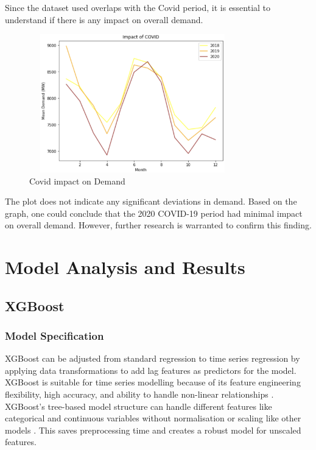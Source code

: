 \documentclass[mstat,12pt]{unswthesis}
\begin{document}
Since the dataset used overlaps with the Covid period, it is essential
to understand if there is any impact on overall demand.

\begin{figure}[H]
\centering
\includegraphics[width=0.80\textwidth,height=6cm]{covid_impact.png}
\caption{Covid impact on Demand}
\label{covid_impact}
\end{figure}

The plot does not indicate any significant deviations in demand. Based
on the graph, one could conclude that the 2020 COVID-19 period had
minimal impact on overall demand. However, further research is warranted
to confirm this finding.

\chapter{Model Analysis and Results}\label{model-analysis-and-results}

\section{XGBoost}\label{xgboost}

\subsection{Model Specification}\label{model-specification}

XGBoost can be adjusted from standard regression to time series
regression by applying data transformations to add lag features as
predictors for the model. XGBoost is suitable for time series modelling
because of its feature engineering flexibility, high accuracy, and
ability to handle non-linear relationships
\cite{brownlee_gradientboosting2020}. XGBoost's tree-based model
structure can handle different features like categorical and continuous
variables without normalisation or scaling like other models
\cite{ambika_2023_xgboost}. This saves preprocessing time and creates a
robust model for unscaled features.
\end{document}
